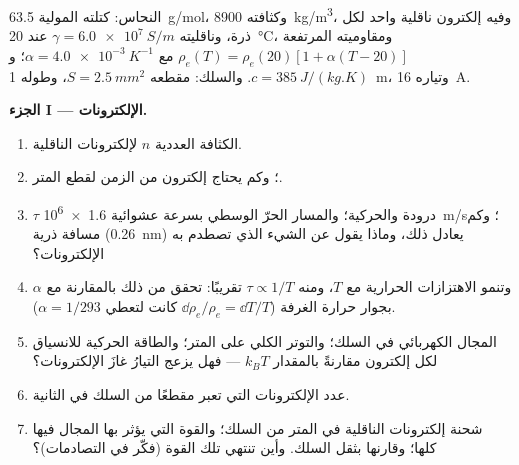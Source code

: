 \begin{problem}
\label{pb:b2:charges-currents-conduction:1}

النحاس: كتلته المولية \qty{63.5}{g/mol}، وكثافته \qty{8900}{kg/m^3}، وفيه
إلكترون ناقلية واحد لكل ذرة، وناقليته $\gamma = \qty{6.0e7}{S/m}$ عند
\qty{20}{\degreeCelsius}، ومقاوميته المرتفعة $\rho_e(T) = \rho_e(20)[1 +
\alpha(T - 20)]$ مع $\alpha = \qty{4.0e-3}{K^{-1}}$؛ و $c = \qty{385}{J/(kg.K)}$. والسلك:
مقطعه $S = \qty{2.5}{mm^2}$، وطوله \qty{1}{m}، وتياره \qty{16}{A}.

\medskip
\noindent\textbf{الجزء I --- الإلكترونات.}
\begin{enumerate}
  \item الكثافة العددية $n$ لإلكترونات الناقلية.
  \item {} ؛ وكم يحتاج إلكترون من
        الزمن لقطع المتر.
  \item $\tau$ درودة والحركية؛ والمسار الحرّ الوسطي بسرعة عشوائية
        \qty{1.6e6}{m/s}؛ وكم مسافة ذرية (\qty{0.26}{nm}) يعادل ذلك،
        وماذا يقول عن الشيء الذي تصطدم به
        الإلكترونات؟
  \item وتنمو الاهتزازات الحرارية مع $T$، ومنه $\tau \propto 1/T$ تقريبًا:
        تحقق من ذلك بالمقارنة مع $\alpha$ بجوار حرارة الغرفة ($\dd\rho_e/\rho_e =
        \dd T/T$ كانت لتعطي $\alpha = 1/293$).
  \item المجال الكهربائي في السلك؛ والتوتر الكلي على المتر؛
        والطاقة الحركية للانسياق لكل إلكترون مقارنةً بالمقدار $k_BT$ ---
        فهل يزعج التيارُ غازَ الإلكترونات؟
  \item عدد الإلكترونات التي تعبر مقطعًا من السلك في الثانية.
  \item شحنة إلكترونات الناقلية في المتر من السلك؛ والقوة
        التي يؤثر بها المجال فيها كلها؛ وقارنها بثقل
        السلك. وأين تنتهي تلك القوة (فكّر في
        التصادمات)؟
\end{enumerate}


\end{problem}

